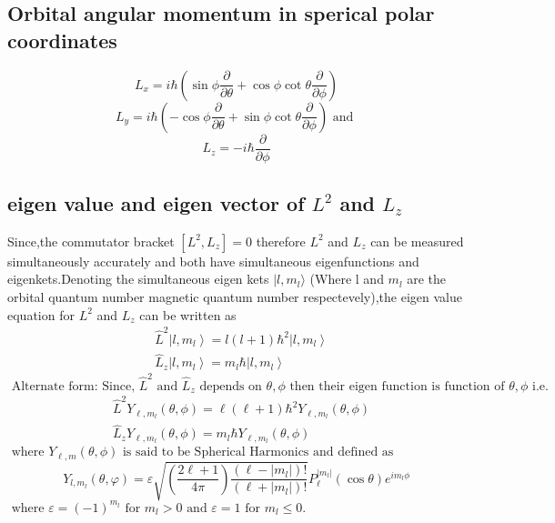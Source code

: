\subsection{Orbital angular momentum in sperical polar coordinates }

	$$L_{x}=i\hbar\left(\sin \phi \frac{\partial}{\partial \theta}+\cos \phi \cot \theta \frac{\partial}{\partial \phi}\right) $$
	$$L_{y}=i \hbar\left(-\cos \phi \frac{\partial}{\partial \theta}+\sin \phi \cot \theta \frac{\partial}{\partial \phi}\right) \text { and }$$
	$$L_{z}=-i \hbar \frac{\partial}{\partial \phi}$$

\subsection{eigen value and eigen vector of $L^2$ and $L_z$}
Since,the commutator bracket $\left[ L^2,L_z\right] =0$ therefore $L^2$ and $L_z$ can be measured simultaneously accurately and both have simultaneous eigenfunctions and eigenkets.Denoting the simultaneous eigen kets $|l,m_l\rangle $ (Where l and $m_l$ are the orbital quantum number magnetic quantum number respectevely),the eigen value equation for $L^2$ and $L_z$ can be written as 
$$\begin{aligned}
	&\hat{L}^{2}\left|l, m_{l}\right\rangle=l(l+1) \hbar^{2}\left|l, m_{l}\right\rangle \\
	&\hat{L}_{z}\left|l, m_{l}\right\rangle=m_{l} \hbar\left|l, m_{l}\right\rangle
\end{aligned}$$
$\text { Alternate form: Since, } \hat{L}^{2} \text { and } \hat{L}_{z} \text { depends on } \theta, \phi \text { then their eigen function is function of } \theta, \phi \text { i.e. }$
$$\begin{aligned}
	&\hat{L}^{2} Y_{\ell, m_{l}}(\theta, \phi)=\ell(\ell+1) \hbar^{2} Y_{\ell, m_{l}}(\theta, \phi) \\
	&\hat{L}_{z} Y_{\ell, m_{l}}(\theta, \phi)=m_{l} \hbar Y_{\ell, m_{l}}(\theta, \phi)
\end{aligned}$$
$\text { where } Y_{\ell, m}(\theta, \phi) \text { is said to be Spherical Harmonics and defined as }$
$$Y_{l, m_{l}}(\theta, \varphi)=\varepsilon \sqrt{\left(\frac{2 \ell+1}{4 \pi}\right) \frac{\left(\ell-\left|m_{l}\right|\right) !}{\left(\ell+\left|m_{l}\right|\right) !}} P_{\ell}^{\left|m_{l}\right|}(\cos \theta) e^{i m_{l} \phi}$$
$\text { where } \varepsilon=(-1)^{m_{l}} \text { for } m_{l}>0 \text { and } \varepsilon=1 \text { for } m_{l} \leq 0 \text {. }$\\
